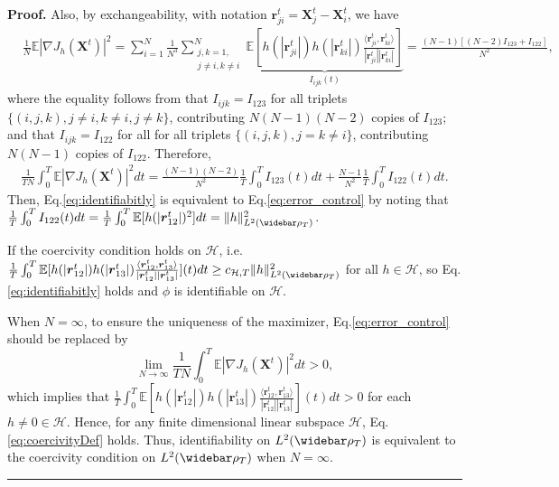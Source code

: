 \documentclass[]{elsarticle}
\def\E{\mathbb{E}}
\newcommand{\wbar}\widebar
\newcommand{\mbf}[1]{\boldsymbol{#1}}
\newcommand{\br}{\mbf{r}}
\newcommand{\bX}{\mbf{X}}
\def\pV{J}
\newcommand{\hypspace}{\mathcal{H}}
\newenvironment{proof}[1][Proof]{\noindent\textbf{#1.} }{\ \rule{0.5em}{0.5em}}
\numberwithin{equation}{section}
\numberwithin{theorem}{section}
\begin{document}
\begin{proof}
Also, by exchangeability, with notation $\br_{ji}^t =\bX_j^t-\bX_{i}^t$,  we have 
\begin{align*}
& \frac{1}{N} \E |\nabla \pV_{h}(\bX^t)|^2  = \sum_{i=1}^N\frac{1}{N^3} \sum_{\substack{ j,k=1,\\ j\neq i, k\neq i} }^N \underbrace{\E[ h(|\br_{ji}^t|) h(|\br_{ki}^t|)\frac{\langle \br_{ji}^t,\br_{ki}^t \rangle }{|\br_{ji}^t||\br_{ki}^t|} ]}_{I_{ijk}(t)} 
= \frac{(N-1)[ (N-2)I_{123}+ I_{122}]}{N^2} ,
 \end{align*}
 where the equality follows from that $I_{ijk} = I_{123}$ for all triplets $\{(i,j,k), j\neq i, k\neq i, j\neq k\}$, contributing $N(N-1)(N-2)$ copies of $I_{123}$; and that $I_{ijk} = I_{122}$ for all for all triplets $\{(i,j,k), j=k\neq i\}$, contributing $N(N-1)$ copies of $I_{122}$. 
 Therefore, 
  \begin{align}\label{eq:ExpJh} 
  \frac{1}{TN}\int_{0}^T \E |\nabla \pV_{h}(\bX^t)|^2 dt = \frac{(N-1)(N-2)}{N^2} \frac{1}{T}\int_{0}^T   I_{123}(t)dt + \frac{N-1}{N^2} \frac{1}{T}\int_{0}^T   I_{122}(t)dt. 
  \end{align}
Then, Eq.\eqref{eq:identifiabitly} is equivalent to Eq.\eqref{eq:error_control} by noting that $\frac{1}{T}\int_0^T I_{122}(t) dt = \frac{1}{T}\int_0^T \E[h(|\br_{12}^t|)^2]dt = \|h\|_{L^2(\wbar \rho_T)}^2$. 
 
 If the coercivity condition holds on $\hypspace$, i.e.  $
\frac{1}{T}\int_{0}^T   \E[ h(|\br_{12}^t|) h(|\br_{13}^t|)\frac{\langle \br_{12}^t,\br_{13}^t \rangle}{|\br_{12}^t||\br_{13}^t|} ](t)dt
 \geq c_{\hypspace,T} \|h\|_{L^2(\wbar\rho_T)}^2  
$
 for all $h\in \hypspace$, so Eq.\eqref{eq:identifiabitly} holds and $\phi$ is identifiable on $\hypspace$. 
 
 When $N=\infty$, to ensure the uniqueness of the maximizer, Eq.\eqref{eq:error_control} should be replaced by 
 \begin{equation*}
 \lim_{N\to\infty} \frac{1}{TN}\int_{0}^T \E |\nabla \pV_{h}(\bX^t)|^2 dt  >0,
 \end{equation*}
which implies that $\frac{1}{T}\int_{0}^T   \E[ h(|\br_{12}^t|) h(|\br_{13}^t|)\frac{\langle \br_{12}^t,\br_{13}^t \rangle}{|\br_{12}^t||\br_{13}^t|} ](t)dt>0$ for each $h\neq 0 \in \hypspace$. Hence, for any finite dimensional linear subspace $\hypspace$, Eq.\eqref{eq:coercivityDef} holds. Thus, identifiability on $L^2(\wbar\rho_T)$ is equivalent to the coercivity condition on $L^2(\wbar\rho_T)$ when $N=\infty$. 
\end{proof}
\end{document}
